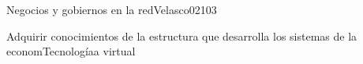\begin{syllabus}
\begin{unit}{Negocios y gobiernos en la red}{Velasco02}{10}{3}
   \begin{unitgoals}
      \item Adquirir conocimientos de la estructura que desarrolla los sistemas de la economTecnologíaa virtual
   \end{unitgoals}
\end{unit}

\begin{coursebibliography}
\end{coursebibliography}
\end{syllabus}
